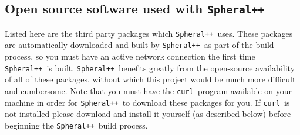 \documentclass{article}
\newcommand{\Spheral}{{\tt Spheral++}}
\newcommand{\curl}{{\tt curl}}
\begin{document}
\subsection{Open source software used with \Spheral}
\label{free.sec}
Listed here are the third party packages which \Spheral\ uses.  These packages are automatically downloaded and built by \Spheral\ as part of the build process, so you must have an active network connection the first time \Spheral\ is built.  \Spheral\ benefits greatly from the open-source availability of all of these packages, without which this project would be much more difficult and cumbersome.  Note that you must have the \curl\ program available on your machine in order for \Spheral\ to download these packages for you.  If \curl\ is not installed please download and install it yourself (as described below) before beginning the \Spheral\ build process.
\end{document}
